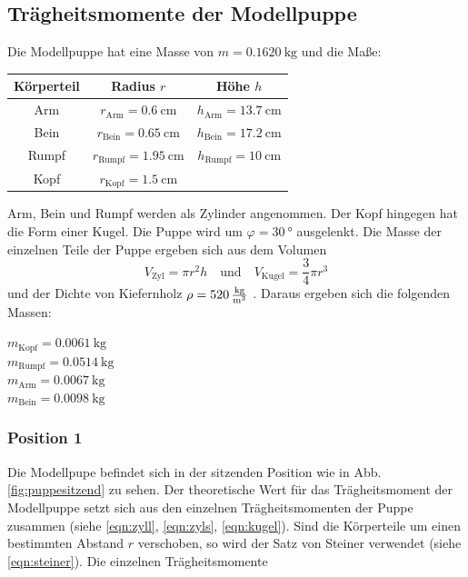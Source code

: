 \subsection{Trägheitsmomente der Modellpuppe}
Die Modellpuppe hat eine Masse von $m=\SI{0.1620}{\kg}$ und die Maße:\\
\begin{table}
    \centering
    \begin{tabular}{c|cc}
    \toprule
    Körperteil & Radius $r$ & Höhe $h$ \\ 
    \midrule
    Arm & $r_\text{Arm} = \SI{0.6}{\centi\metre}$ & \quad $h_\text{Arm} = \SI{13.7}{\centi\metre}$ \\
    Bein & $r_\text{Bein} = \SI{0.65}{\centi\metre}$ & \quad $h_\text{Bein} = \SI{17.2}{\centi\metre}$ \\
    Rumpf & $r_\text{Rumpf} = \SI{1.95}{\centi\metre}$ & \quad $h_\text{Rumpf} = \SI{10}{\centi\metre}$ \\
    Kopf & $r_\text{Kopf} = \SI{1.5}{\centi\metre}$ & \\
    \bottomrule
    \end{tabular}
\end{table}
\FloatBarrier
Arm, Bein und Rumpf werden als Zylinder angenommen.
Der Kopf hingegen hat die Form einer Kugel.
Die Puppe wird um $\varphi = \SI{30}{\degree}$ ausgelenkt.
Die Masse der einzelnen Teile der Puppe ergeben sich aus dem Volumen
\begin{equation*}
    V_\text{Zyl} = \pi r^2 h \quad \text{und} \quad V_\text{Kugel} = \frac{3}{4}\pi r^3
\end{equation*}
und der Dichte von Kiefernholz $\rho = \SI{520}{\frac{\kg}{\metre^3}}$ \cite{holz}.
Daraus ergeben sich die folgenden Massen:\\
\begin{center}
    $m_\text{Kopf} = \SI{0.0061}{\kg}$ \\
    $m_\text{Rumpf} = \SI{0.0514}{\kg}$ \\
    $m_\text{Arm} = \SI{0.0067}{\kg}$ \\
    $m_\text{Bein} = \SI{0.0098}{\kg}$ \\
\end{center}
\subsubsection{Position 1}
Die Modellpupe befindet sich in der sitzenden Position wie in Abb. \ref{fig:puppesitzend} zu sehen.
Der theoretische Wert für das Trägheitsmoment der Modellpuppe setzt sich aus den einzelnen Trägheitsmomenten der Puppe zusammen (siehe \autoref{eqn:zyll}, \autoref{eqn:zyls}, \autoref{eqn:kugel}).
Sind die Körperteile um einen bestimmten Abstand $r$ verschoben, so wird der Satz von Steiner verwendet (siehe \autoref{eqn:steiner}).
Die einzelnen Trägheitsmomente

